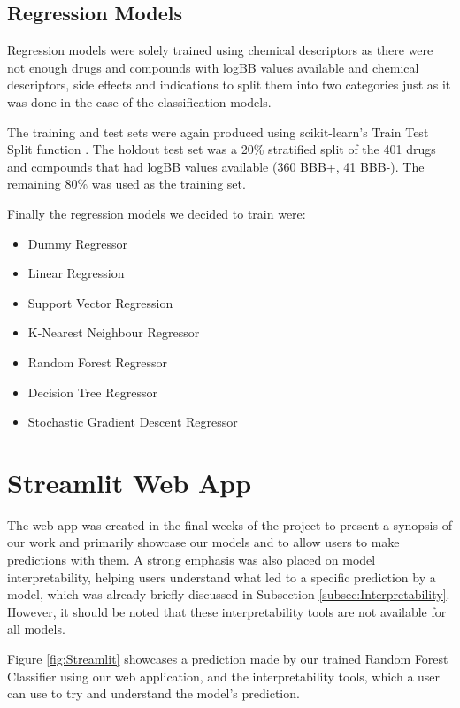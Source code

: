 \subsection{Regression Models}

Regression models were solely trained using chemical descriptors as there were not enough drugs and compounds with logBB values available and chemical descriptors, side effects and indications to split them into two categories just as it was done in the case of the classification models.

The training and test sets were again produced using scikit-learn's Train Test Split function \citep{TrainTestSplit}. The holdout test set was a 20\% stratified split of the 401 drugs and compounds that had logBB values available (360 BBB+, 41 BBB-). The remaining 80\% was used as the training set.

Finally the regression models we decided to train were:
\begin{itemize}
    \item 
    Dummy Regressor
    \item 
    Linear Regression
    \item 
    Support Vector Regression
    \item 
    K-Nearest Neighbour Regressor
    \item 
    Random Forest Regressor
    \item 
    Decision Tree Regressor
    \item 
    Stochastic Gradient Descent Regressor
\end{itemize}


\section{Streamlit Web App}

The web app was created in the final weeks of the project to present a synopsis of our work and primarily showcase our models and to allow users to make predictions with them. A strong emphasis was also placed on model interpretability, helping users understand what led to a specific prediction by a model, which was already briefly discussed in Subsection \ref{subsec:Interpretability}. However, it should be noted that these interpretability tools are not available for all models.

Figure \ref{fig:Streamlit} showcases a prediction made by our trained Random Forest Classifier using our web application, and the interpretability tools, which a user can use to try and understand the model's prediction.

